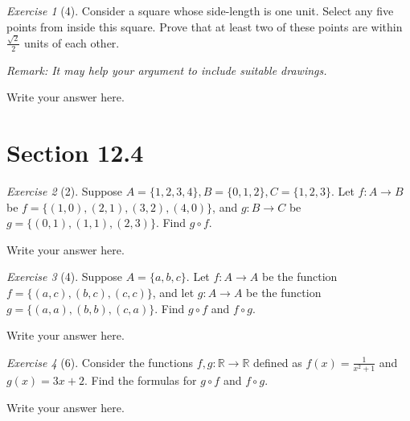 \documentclass[12pt]{amsart}
\makeatletter
\theoremstyle{remark}
\newtheorem*{exercise}{Exercise}%
\def\RR{\ensuremath{\mathbb R}}
\renewenvironment{proof}[1][\proofname]{\par\doublespacing
  \pushQED{\qed}%
  \normalfont \topsep6\p@\@plus6\p@\relax
  \list{}{%
    \settowidth{\leftmargin}{\itshape\proofname:\hskip\labelsep}%
    \setlength{\labelwidth}{0pt}%
    \setlength{\itemindent}{-\leftmargin}%
  }%
  \item[\hskip\labelsep\itshape#1\@addpunct{:}]\ignorespaces
}{%
  \popQED\endlist\@endpefalse
  \singlespacing
}
\theoremstyle{mycomment}
\makeatother
\begin{document}
\begin{exercise}[4] Consider a square whose side-length is one unit. Select any five points from  inside this square. Prove that at least two of these points are within $\frac{\sqrt{2}}{2}$ units of each other.

\emph{Remark: It may help your argument to include suitable drawings.}
\begin{proof}
Write your answer here.
\end{proof}
\end{exercise}

\section*{Section 12.4}
\begin{exercise}[2] Suppose $A=\{1,2,3,4\}, B=\{0,1,2\}, C=\{1,2,3\}$. Let $f:A\to B$ be $f=\{(1,0),(2,1),(3,2),(4,0)\}$, and $g:B\to C$ be $g=\{(0,1),(1,1),(2,3)\}$. Find $g\circ f$.
\begin{proof}[Solution]
Write your answer here.
\end{proof}
\end{exercise}

\begin{exercise}[4] Suppose $A=\{a,b,c\}$. Let $f:A\to A$ be the function $f=\{(a,c),(b,c),(c,c)\}$, and let $g:A\to A$ be the function $g=\{(a,a),(b,b),(c,a)\}$. Find $g\circ f$ and $f\circ g$.
\begin{proof}[Solution]
Write your answer here.
\end{proof}
\end{exercise}

\begin{exercise}[6] Consider the functions $f,g:\RR\to\RR$ defined as $f(x)=\frac{1}{x^{2}+1}$ and $g(x)=3x+2$. Find the formulas for $g\circ f$ and $f\circ g$.
\begin{proof}[Solution]
Write your answer here.
\end{proof}
\end{exercise}
\end{document}
